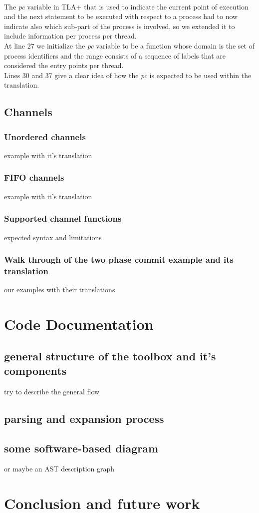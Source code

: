 \documentclass{thesul}
\begin{document}
\hfill\\
The \textit{pc} variable in TLA+ that is used to indicate the current point of execution and the next statement to be executed with respect to a process had to now indicate also which sub-part of the process is involved, so we extended it to include information per process per thread.
\hfill\\ At line 27 we initialize the \textit{pc} variable to be a function whose domain is the set of process identifiers and the range consists of a sequence of labels that are considered the entry points per thread.
\hfill\\ Lines 30 and 37 give a clear idea of how the \textit{pc} is expected to be used within the translation.


\section{Channels}
\subsection{Unordered channels}
example with it's translation
\subsection{FIFO channels}
example with it's translation
\subsection{Supported channel functions}
expected syntax and limitations
\subsection{Walk through of the two phase commit example and its translation}
our examples with their translations

\chapter{Code Documentation}

\section{general structure of the toolbox and it's components}
try to describe the general flow

\section{parsing and expansion process}

\section{some software-based diagram}

or maybe an AST description graph

\chapter{Conclusion and future work}


\end{document}

